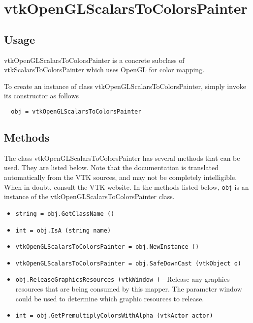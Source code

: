 \section{vtkOpenGLScalarsToColorsPainter}

\subsection{Usage}

 vtkOpenGLScalarsToColorsPainter is a concrete subclass of
 vtkScalarsToColorsPainter which uses OpenGL for color mapping.

To create an instance of class vtkOpenGLScalarsToColorsPainter, simply
invoke its constructor as follows
\begin{verbatim}
  obj = vtkOpenGLScalarsToColorsPainter
\end{verbatim}
\subsection{Methods}

The class vtkOpenGLScalarsToColorsPainter has several methods that can be used.
  They are listed below.
Note that the documentation is translated automatically from the VTK sources,
and may not be completely intelligible.  When in doubt, consult the VTK website.
In the methods listed below, \verb|obj| is an instance of the vtkOpenGLScalarsToColorsPainter class.
\begin{itemize}
\item  \verb|string = obj.GetClassName ()|

\item  \verb|int = obj.IsA (string name)|

\item  \verb|vtkOpenGLScalarsToColorsPainter = obj.NewInstance ()|

\item  \verb|vtkOpenGLScalarsToColorsPainter = obj.SafeDownCast (vtkObject o)|

\item  \verb|obj.ReleaseGraphicsResources (vtkWindow )| -  Release any graphics resources that are being consumed by this mapper.
 The parameter window could be used to determine which graphic
 resources to release. 

\item  \verb|int = obj.GetPremultiplyColorsWithAlpha (vtkActor actor)|

\end{itemize}
